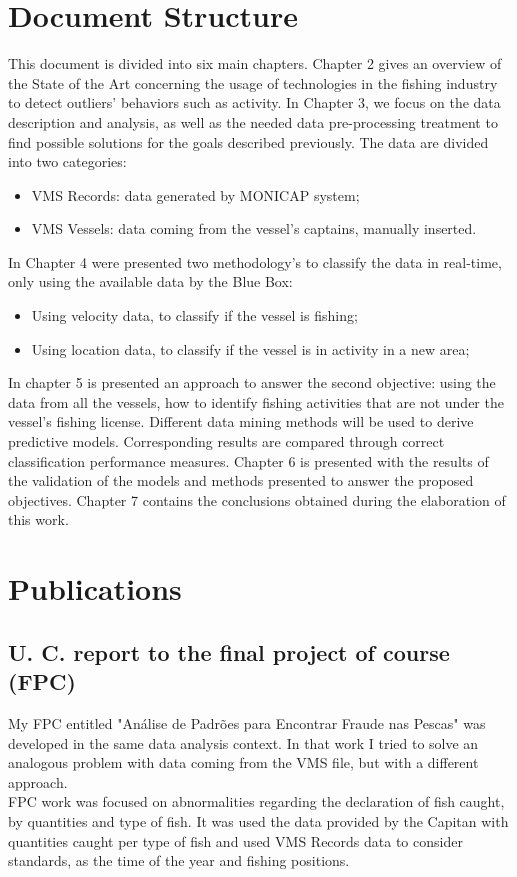 \section{Document Structure} %
\label{sec:work_structure}
This document is divided into six main chapters. Chapter 2 gives an overview of the State of the Art concerning the usage of technologies in the fishing industry to detect outliers' behaviors such as activity. In Chapter 3, we focus on the data description and analysis, as well as the needed data pre-processing treatment to find possible solutions for the goals described previously. The data are divided into two categories:
\begin{itemize}
\item VMS Records: data generated by MONICAP system;
\item VMS Vessels: data coming from the vessel's captains, manually inserted.
\end{itemize}
In Chapter 4 were presented two methodology's to classify the data in real-time, only using the available data by the Blue Box:
\begin{itemize}
\item Using velocity data, to classify if the vessel is fishing;
\item Using location data, to classify if the vessel is in activity in a new area;
\end{itemize}
In chapter 5 is presented an approach to answer the second objective: using the data from all the vessels, how to identify fishing activities that are not under the vessel's fishing license. Different data mining methods will be used to derive predictive models. Corresponding results are compared through correct classification performance measures.
Chapter 6 is presented with the results of the validation of the models and methods presented to answer the proposed objectives.
Chapter 7 contains the conclusions obtained during the elaboration of this work.


\section{Publications} %
\label{sec:publications}

\subsection{U. C. report to the final project of course (FPC)} %
\label{sub:fpc}
My FPC entitled "Análise de Padrões para Encontrar Fraude nas Pescas" was developed in the same data analysis context. In that work I tried to solve an analogous problem with data coming from the VMS file, but with a different approach.\\
FPC work was focused on abnormalities regarding the declaration of fish caught, by quantities and type of fish. It was used the data provided by the Capitan with quantities caught per type of fish and used VMS Records data to consider standards, as the time of the year and fishing positions.

